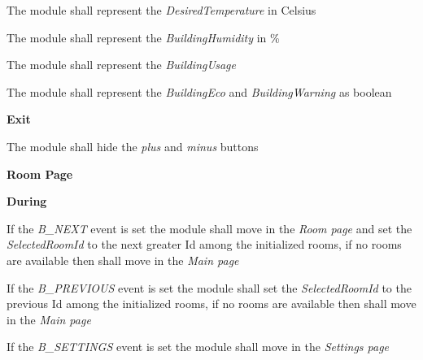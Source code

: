 \begin{req_enum}
\begin{req_enum}[label*=\arabic*.]
\begin{req_enum}[label*=\arabic*.]
\begin{req_enum}[label*=\arabic*.]
								\item The module shall represent the \textit{DesiredTemperature} in Celsius\degree \\
								\item The module shall represent the \textit{BuildingHumidity} in \% \\
								\item The module shall represent the \textit{BuildingUsage} \\
								\item The module shall represent the \textit{BuildingEco} and \textit{BuildingWarning} as boolean \\
							\end{req_enum}
							\item \textbf{Exit}
							\begin{req_enum}[label*=\arabic*.]
								\item The module shall hide the \textit{plus} and \textit{minus} buttons
							\end{req_enum}	
						\end{req_enum}

					\item \textbf{Room Page}
						\begin{req_enum}[label*=\arabic*.]
							\item \textbf{During}
							\begin{req_enum}[label*=\arabic*.]
								\item If the \textit{B\_NEXT} event is set the module shall move in the \textit{Room page} and set the \textit{SelectedRoomId} to the next greater Id among the initialized rooms, if no rooms are available then shall move in the \textit{Main page} \\
								\item If the \textit{B\_PREVIOUS} event is set the module shall set the \textit{SelectedRoomId} to the previous Id among the initialized rooms, if no rooms are available then shall move in the \textit{Main page} \\
								\item If the \textit{B\_SETTINGS} event is set the module shall move in the \textit{Settings page}


\end{req_enum}
\end{req_enum}
\end{req_enum}
\end{req_enum}
